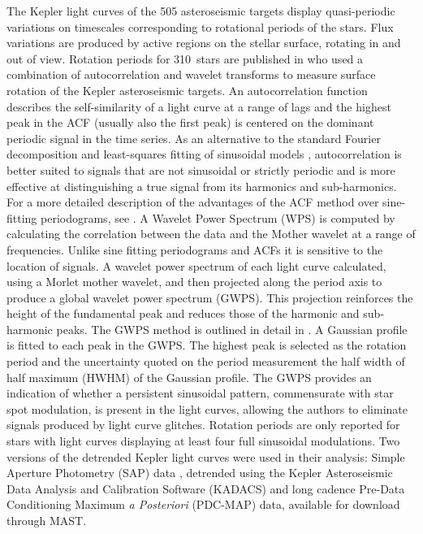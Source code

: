 \documentclass[12pt,preprint]{aastex}
\newcommand{\ngarcia}{310~}
\begin{document}
The Kepler light curves of the 505 asteroseismic targets display quasi-periodic variations on timescales corresponding to rotational periods of the stars.
Flux variations are produced by active regions on the stellar surface, rotating in and out of view.
Rotation periods for \ngarcia stars are published in \citet{Garcia2014} who used a combination of autocorrelation and wavelet transforms to measure surface rotation of the Kepler asteroseismic targets.
An autocorrelation function describes the self-similarity of a light curve at a range of lags and the highest peak in the ACF (usually also the first peak) is centered on the dominant periodic signal in the time series.
As an alternative to the standard Fourier decomposition and least-squares fitting of sinusoidal models \citep{Zechmeister}, autocorrelation is better suited to signals that are not sinusoidal or strictly periodic and is more effective at distinguishing a true signal from its harmonics and sub-harmonics.
For a more detailed description of the advantages of the ACF method over sine-fitting periodograms, see \citet{McQuillan}.
A Wavelet Power Spectrum (WPS) is computed by calculating the correlation between the data and the Mother wavelet at a range of frequencies.
Unlike sine fitting periodograms and ACFs it is sensitive to the location of signals.
A wavelet power spectrum of each light curve calculated, using a Morlet mother wavelet, and then projected along the period axis to produce a global wavelet power spectrum (GWPS).
This projection reinforces the height of the fundamental peak and reduces those of the harmonic and sub-harmonic peaks.
The GWPS method is outlined in detail in \citep{Mathur2014}.
A Gaussian profile is fitted to each peak in the GWPS.
The highest peak is selected as the rotation period and the uncertainty quoted on the period measurement the half width of half maximum (HWHM) of the Gaussian profile.
The GWPS provides an indication of whether a persistent sinusoidal pattern, commensurate with star spot modulation, is present in the light curves, allowing the authors to eliminate signals produced by light curve glitches.
Rotation periods are only reported for stars with light curves displaying at least four full sinusoidal modulations.
Two versions of the detrended Kepler light curves were used in their analysis: Simple Aperture Photometry (SAP) data \citep{Thompson2013}, detrended using the Kepler Asteroseismic Data Analysis and Calibration Software (KADACS) \citep{Garcia2011} and long cadence Pre-Data Conditioning Maximum \emph{a Posteriori} (PDC-MAP) data, available for download through MAST.
\end{document}

